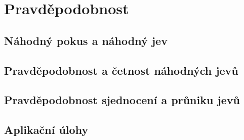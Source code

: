 
\newpage
    \section{Pravděpodobnost}
        \subsection{Náhodný pokus a náhodný jev}
        \subsection{Pravděpodobnost a četnost náhodných jevů}
        \subsection{Pravděpodobnost sjednocení a průniku jevů}
        \subsection{Aplikační úlohy}
